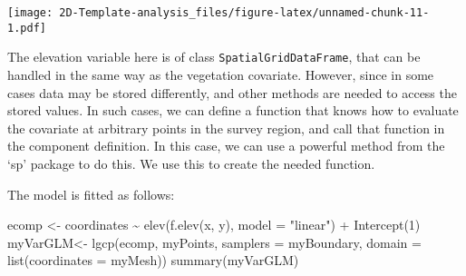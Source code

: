 \documentclass[
]{article}
\newenvironment{Shaded}{\begin{snugshade}}{\end{snugshade}}
\newcommand{\AttributeTok}[1]{\textcolor[rgb]{0.77,0.63,0.00}{#1}}
\newcommand{\CommentTok}[1]{\textcolor[rgb]{0.56,0.35,0.01}{\textit{#1}}}
\newcommand{\ControlFlowTok}[1]{\textcolor[rgb]{0.13,0.29,0.53}{\textbf{#1}}}
\newcommand{\DecValTok}[1]{\textcolor[rgb]{0.00,0.00,0.81}{#1}}
\newcommand{\FunctionTok}[1]{\textcolor[rgb]{0.00,0.00,0.00}{#1}}
\newcommand{\NormalTok}[1]{#1}
\newcommand{\OtherTok}[1]{\textcolor[rgb]{0.56,0.35,0.01}{#1}}
\newcommand{\SpecialCharTok}[1]{\textcolor[rgb]{0.00,0.00,0.00}{#1}}
\newcommand{\StringTok}[1]{\textcolor[rgb]{0.31,0.60,0.02}{#1}}
\begin{document}
\texttt{[image: 2D-Template-analysis\_files/figure-latex/unnamed-chunk-11-1.pdf]}

The elevation variable here is of class \texttt{SpatialGridDataFrame},
that can be handled in the same way as the vegetation covariate.
However, since in some cases data may be stored differently, and other
methods are needed to access the stored values. In such cases, we can
define a function that knows how to evaluate the covariate at arbitrary
points in the survey region, and call that function in the component
definition. In this case, we can use a powerful method from the `sp'
package to do this. We use this to create the needed function.

\begin{Shaded}
\end{Shaded}

The model is fitted as follows:

\begin{Shaded}
\begin{Highlighting}[]
\NormalTok{ecomp }\OtherTok{\textless{}{-}}\NormalTok{ coordinates }\SpecialCharTok{\textasciitilde{}} \FunctionTok{elev}\NormalTok{(}\FunctionTok{f.elev}\NormalTok{(x, y), }\AttributeTok{model =} \StringTok{"linear"}\NormalTok{) }\SpecialCharTok{+} \FunctionTok{Intercept}\NormalTok{(}\DecValTok{1}\NormalTok{)}
\NormalTok{myVarGLM}\OtherTok{\textless{}{-}} \FunctionTok{lgcp}\NormalTok{(ecomp, myPoints, }\AttributeTok{samplers =}\NormalTok{ myBoundary, }\AttributeTok{domain =} \FunctionTok{list}\NormalTok{(}\AttributeTok{coordinates =}\NormalTok{ myMesh))}
\FunctionTok{summary}\NormalTok{(myVarGLM)}
\end{Highlighting}
\end{Shaded}
\end{document}

